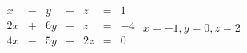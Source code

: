 {$\begin{array}{ccccccc}
x&-&y&+&z&=&1\\
2x&+&6y&-&z&=&-4\\
4x&-&5y&+&2z&=&0\\
\end{array}$}
{$x = -1, y=0,z=2$}